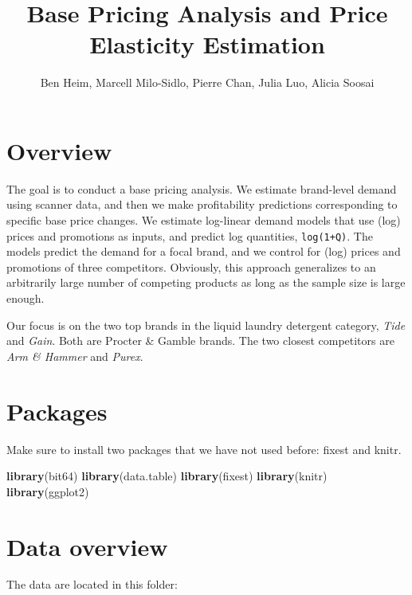\documentclass[
]{article}
\title{Base Pricing Analysis and Price Elasticity Estimation}
\author{Ben Heim, Marcell Milo-Sidlo, Pierre Chan, Julia Luo, Alicia
Soosai}
\date{}
\newenvironment{Shaded}{\begin{snugshade}}{\end{snugshade}}
\newcommand{\FunctionTok}[1]{\textcolor[rgb]{0.13,0.29,0.53}{\textbf{#1}}}
\newcommand{\NormalTok}[1]{#1}
\begin{document}
\maketitle

{
\hypersetup{linkcolor=}
\setcounter{tocdepth}{2}
\tableofcontents
}
\setlength{\parskip}{6pt}
\newpage

\section{Overview}\label{overview}

The goal is to conduct a base pricing analysis. We estimate brand-level
demand using scanner data, and then we make profitability predictions
corresponding to specific base price changes. We estimate log-linear
demand models that use (log) prices and promotions as inputs, and
predict log quantities, \texttt{log(1+Q)}. The models predict the demand
for a focal brand, and we control for (log) prices and promotions of
three competitors. Obviously, this approach generalizes to an
arbitrarily large number of competing products as long as the sample
size is large enough.

Our focus is on the two top brands in the liquid laundry detergent
category, \emph{Tide} and \emph{Gain}. Both are Procter \& Gamble
brands. The two closest competitors are \emph{Arm \& Hammer} and
\emph{Purex}.

\section{Packages}\label{packages}

Make sure to install two packages that we have not used before: fixest
and knitr.

\begin{Shaded}
\begin{Highlighting}[]
\FunctionTok{library}\NormalTok{(bit64)}
\FunctionTok{library}\NormalTok{(data.table)}
\FunctionTok{library}\NormalTok{(fixest)}
\FunctionTok{library}\NormalTok{(knitr)}
\FunctionTok{library}\NormalTok{(ggplot2)}
\end{Highlighting}
\end{Shaded}

\newpage

\section{Data overview}\label{data-overview}

The data are located in this folder:
\end{document}
